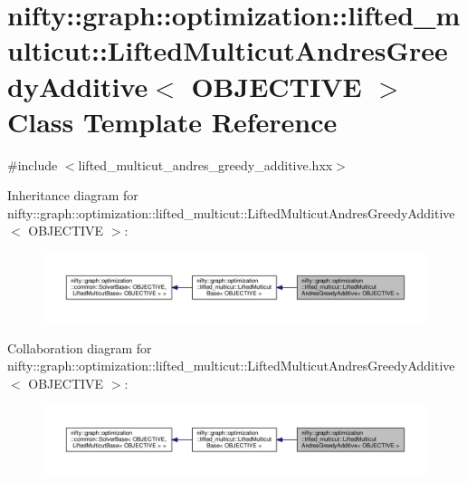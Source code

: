 \hypertarget{classnifty_1_1graph_1_1optimization_1_1lifted__multicut_1_1LiftedMulticutAndresGreedyAdditive}{}\section{nifty\+:\+:graph\+:\+:optimization\+:\+:lifted\+\_\+multicut\+:\+:Lifted\+Multicut\+Andres\+Greedy\+Additive$<$ O\+B\+J\+E\+C\+T\+I\+V\+E $>$ Class Template Reference}
\label{classnifty_1_1graph_1_1optimization_1_1lifted__multicut_1_1LiftedMulticutAndresGreedyAdditive}


{\ttfamily \#include $<$lifted\+\_\+multicut\+\_\+andres\+\_\+greedy\+\_\+additive.\+hxx$>$}



Inheritance diagram for nifty\+:\+:graph\+:\+:optimization\+:\+:lifted\+\_\+multicut\+:\+:Lifted\+Multicut\+Andres\+Greedy\+Additive$<$ O\+B\+J\+E\+C\+T\+I\+V\+E $>$\+:\nopagebreak
\begin{figure}[H]
\begin{center}
\leavevmode
\includegraphics[width=350pt]{classnifty_1_1graph_1_1optimization_1_1lifted__multicut_1_1LiftedMulticutAndresGreedyAdditive__inherit__graph}
\end{center}
\end{figure}


Collaboration diagram for nifty\+:\+:graph\+:\+:optimization\+:\+:lifted\+\_\+multicut\+:\+:Lifted\+Multicut\+Andres\+Greedy\+Additive$<$ O\+B\+J\+E\+C\+T\+I\+V\+E $>$\+:\nopagebreak
\begin{figure}[H]
\begin{center}
\leavevmode
\includegraphics[width=350pt]{classnifty_1_1graph_1_1optimization_1_1lifted__multicut_1_1LiftedMulticutAndresGreedyAdditive__coll__graph}
\end{center}
\end{figure}
